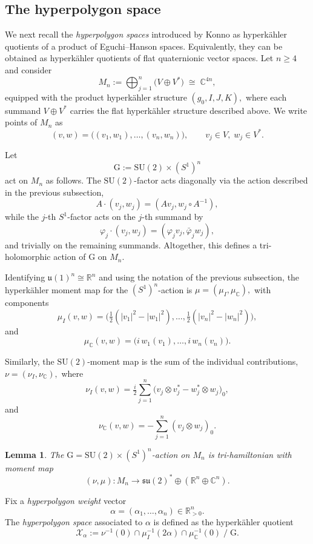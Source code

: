 \documentclass[12pt,a4paper]{amsart}
\newtheorem{lemma}[theorem]{Lemma}
\theoremstyle{definition}
\theoremstyle{remark}
\newcommand{\R}{\mathbb R}
\newcommand{\C}{\mathbb C}
\begin{document}
\subsection{The hyperpolygon space}

We next recall the \emph{hyperpolygon spaces} introduced by Konno \cite{Konno2} as
hyperk\"ahler quotients of a product of Eguchi--Hanson spaces. Equivalently, 
they can be obtained as hyperk\"ahler quotients of flat quaternionic vector spaces.
Let $n\geq 4$ and consider
\[
M_n := \bigoplus_{j=1}^n \bigl(V\oplus V^*\bigr)
\;\cong\; \C^{4n},
\]
equipped with the product hyperk\"ahler structure
$
(g_0,I,J,K),
$
where each summand $V\oplus V^*$ carries the flat hyperk\"ahler structure described
above.
We write points of $M_n$ as
\[
(v,w)=\bigl((v_1,w_1),\dots,(v_n,w_n)\bigr),
\qquad v_j\in V,\; w_j\in V^*.
\]



Let
\[
\mathrm{G}:=\mathrm{SU}(2)\times (S^1)^n
\]
act on $M_n$ as follows.
The $\mathrm{SU}(2)$-factor acts diagonally via the action described in the previous
subsection,
\[
A\cdot (v_j,w_j)=(Av_j,w_j\circ A^{-1}),
\]
while the $j$-th $S^1$-factor acts on the $j$-th summand by
\[
\varphi_j\cdot(v_j,w_j)=(\varphi_j v_j,\bar\varphi_j w_j),
\]
and trivially on the remaining summands.
Altogether, this defines a tri-holomorphic action of $\mathrm{G}$ on $M_n$.




Identifying $\mathfrak{u}(1)^n\cong\R^n$ and using the notation of the previous subsection,
the hyperk\"ahler moment map for the $(S^1)^n$-action is
$
\mu=(\mu_I,\mu_\C),
$
with components
\[
\mu_I(v,w)=\bigl(\tfrac12(|v_1|^2-|w_1|^2),\dots,\tfrac12(|v_n|^2-|w_n|^2)\bigr),
\]
and
\[
\mu_\C(v,w)=\bigl(i\,w_1(v_1),\dots,i\,w_n(v_n)\bigr).
\]

Similarly, the $\mathrm{SU}(2)$-moment map is the sum of the individual contributions,
$
\nu=(\nu_I,\nu_\C),
$
where
\[
\nu_I(v,w)
=\tfrac{i}{2}\sum_{j=1}^n\bigl(v_j\otimes v_j^*-w_j^*\otimes w_j\bigr)_0,
\]
and
\[
\nu_\C(v,w)
=-\sum_{j=1}^n (v_j\otimes w_j)_0.
\]

\begin{lemma}
The $\mathrm{G}=\mathrm{SU}(2)\times (S^1)^n$-action on $M_n$ is tri-hamiltonian with moment map
\[
(\nu,\mu)\colon M_n\to
\mathfrak{su}(2)^*\oplus(\R^n\oplus\C^n).
\]
\end{lemma}


Fix a \emph{hyperpolygon weight} vector
\[
\alpha=(\alpha_1,\dots,\alpha_n)\in\R_{>0}^n.
\]
The \emph{hyperpolygon space} associated to $\alpha$ is defined as the
hyperk\"ahler quotient
\[
\mathcal X_\alpha
:=\nu^{-1}(0)\cap
\mu_I^{-1}(2\alpha)\cap
\mu_\C^{-1}(0)
\;\big/\; \mathrm{G}.
\]
\end{document}
